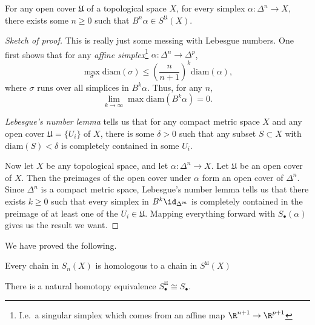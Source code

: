 \documentclass[main.tex]{subfiles}
\begin{document}
\begin{fact}
  \label{fact:barycentric_subdivision}
  For any open cover \(\mathfrak{U}\) of a topological space \(X\), for every simplex \(\alpha\colon \Delta^{n} \to X\), there exists some \(n \geq 0\) such that \(B^{n}\alpha \in S^{\mathfrak{U}}(X)\).
\end{fact}
\begin{proof}[Sketch of proof]
  This is really just some messing with Lebesgue numbers. One first shows that for any \emph{affine simplex}\footnote{I.e.\ a singular simplex which comes from an affine map \(\R^{n+1} \to \R^{p+1}\)} \(\alpha\colon \Delta^{n} \to \Delta^{p}\),
  \begin{equation*}
    \max_{\sigma}\mathrm{diam}(\sigma) \leq \left( \frac{n}{n+1} \right)^{k} \mathrm{diam}(\alpha),
  \end{equation*}
  where \(\sigma\) runs over all simplices in \(B^{k}\alpha\). Thus, for any \(n\),
  \begin{equation*}
    \lim_{k \to \infty} \max \mathrm{diam}(B^{k} \alpha) = 0.
  \end{equation*}

  \emph{Lebesgue's number lemma} tells us that for any compact metric space \(X\) and any open cover \(\mathfrak{U} = \{U_{i}\}\) of \(X\), there is some \(\delta > 0\) such that any subset \(S \subset X\) with \(\mathrm{diam}(S) < \delta\) is completely contained in some \(U_{i}\).

  Now let \(X\) be any topological space, and let \(\alpha\colon\Delta^{n} \to X\). Let \(\mathfrak{U}\) be an open cover of \(X\). Then the preimages of the open cover under \(\alpha\) form an open cover of \(\Delta^{n}\). Since \(\Delta^{n}\) is a compact metric space, Lebesgue's number lemma tells us that there exists \(k \geq 0\) such that every simplex in \(B^{k}\id_{\Delta^{m}}\) is completely contained in the preimage of at least one of the \(U_{i} \in \mathfrak{U}\). Mapping everything forward with \(S_{\bullet}(\alpha)\) gives us the result we want.
\end{proof}

We have proved the following.
\begin{corollary}
  \label{cor:replace_chains_by_homologous_chains_in_open_cover}
  Every chain in \(S_{n}(X)\) is homologous to a chain in \(S^{\mathfrak{U}}(X)\)
\end{corollary}

\begin{proposition}
  There is a natural homotopy equivalence \(S^{\mathfrak{U}}_{\bullet} \cong S_{\bullet} \).
\end{proposition}
\end{document}
